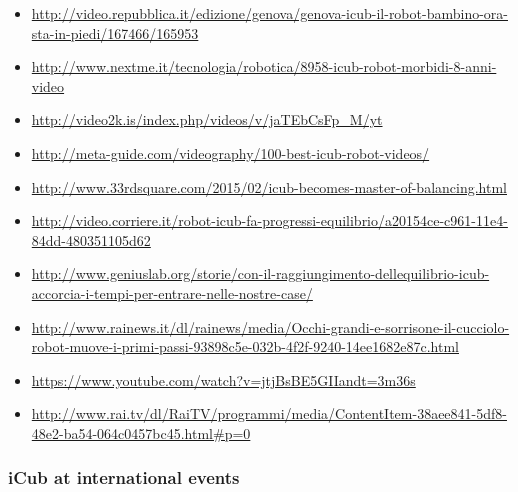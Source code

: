 \begin{itemize}

\item \url{http://video.repubblica.it/edizione/genova/genova-icub-il-robot-bambino-ora-sta-in-piedi/167466/165953}

\item \url{http://www.nextme.it/tecnologia/robotica/8958-icub-robot-morbidi-8-anni-video}

\item \url{http://video2k.is/index.php/videos/v/jaTEbCsFp_M/yt}

\item \url{http://meta-guide.com/videography/100-best-icub-robot-videos/}

\item \url{http://www.33rdsquare.com/2015/02/icub-becomes-master-of-balancing.html}

\item \url{http://video.corriere.it/robot-icub-fa-progressi-equilibrio/a20154ce-c961-11e4-84dd-480351105d62}

\item \url{http://www.geniuslab.org/storie/con-il-raggiungimento-dellequilibrio-icub-accorcia-i-tempi-per-entrare-nelle-nostre-case/}

\item \url{http://www.rainews.it/dl/rainews/media/Occhi-grandi-e-sorrisone-il-cucciolo-robot-muove-i-primi-passi-93898c5e-032b-4f2f-9240-14ee1682e87c.html}

\item \url{https://www.youtube.com/watch?v=jtjBsBE5GIIandt=3m36s}

\item \url{http://www.rai.tv/dl/RaiTV/programmi/media/ContentItem-38aee841-5df8-48e2-ba54-064c0457bc45.html#p=0}
\end{itemize}

\subsubsection{iCub at international events}

